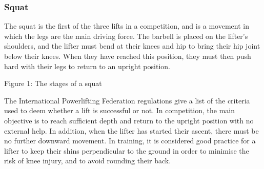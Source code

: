 \subsubsection{Squat}

The squat is the first of the three lifts in a competition, and is a movement in which the legs are the main driving force. The barbell is placed on the lifter’s shoulders, and the lifter must bend at their knees and hip to bring their hip joint below their knees. When they have reached this position, they must then push hard with their legs to return to an upright position.

Figure 1: The stages of a squat

The International Powerlifting Federation regulations\cite{ipf} give a list of the criteria used to deem whether a lift is successful or not. In competition, the main objective is to reach sufficient depth and return to the upright position with no external help. In addition, when the lifter has started their ascent, there must be no further downward movement. In training, it is considered good practice for a lifter to keep their shins perpendicular to the ground in order to minimise the risk of knee injury, and to avoid rounding their back.